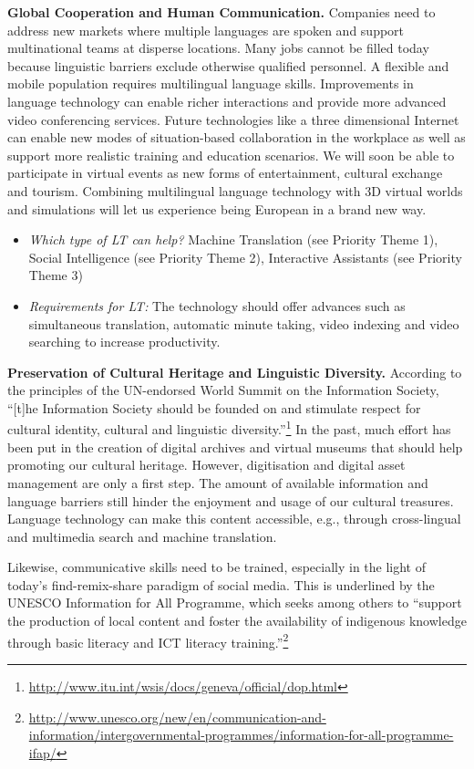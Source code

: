 \documentclass[10pt, plain]{../../metanetpaper}
\begin{document}
\begin{multicols}{2}
\textbf{Global Cooperation and Human Communication.} Companies need to address new markets where multiple languages are spoken and support multinational teams at disperse locations. Many jobs cannot be filled today because linguistic barriers exclude otherwise qualified personnel. A flexible and mobile population requires multilingual language skills. Improvements in language technology can enable richer interactions and provide more advanced video conferencing services. Future technologies like a three dimensional Internet can enable new modes of situation-based collaboration in the workplace as well as support more realistic training and education scenarios. We will soon be able to participate in virtual events as new forms of entertainment, cultural exchange and tourism. Combining multilingual language technology with 3D virtual worlds and simulations will let us experience being European in a brand new way. 

\begin{itemize}
\item \emph{Which type of LT can help?} Machine Translation (see Priority Theme 1), Social Intelligence (see Priority Theme 2), Interactive Assistants (see Priority Theme 3)
\item \emph{Requirements for LT:} The technology should offer advances such as simultaneous translation, automatic minute taking, video indexing and video searching to increase productivity.
\end{itemize}

\textbf{Preservation of Cultural Heritage and Linguistic Diversity.} According to the principles of the UN-endorsed World Summit on the Information Society, “[t]he Information Society should be founded on and stimulate respect for cultural identity, cultural and linguistic diversity.”\footnote{\url{http://www.itu.int/wsis/docs/geneva/official/dop.html}} In the past, much effort has been put in the creation of digital archives and virtual museums that should help promoting our cultural heritage. However, digitisation and digital asset management are only a first step. The amount of available information and language barriers still hinder the enjoyment and usage of our cultural treasures. Language technology can make this content accessible, e.g., through cross-lingual and multimedia search and machine translation.

Likewise, communicative skills need to be trained, especially in the light of today’s find-remix-share paradigm of social media. This is underlined by the UNESCO Information for All Programme, which seeks among others to “support the production of local content and foster the availability of indigenous knowledge through basic literacy and ICT literacy training.”\footnote{\url{http://www.unesco.org/new/en/communication-and-information/intergovernmental-programmes/information-for-all-programme-ifap/}}


\end{multicols}
\end{document}
